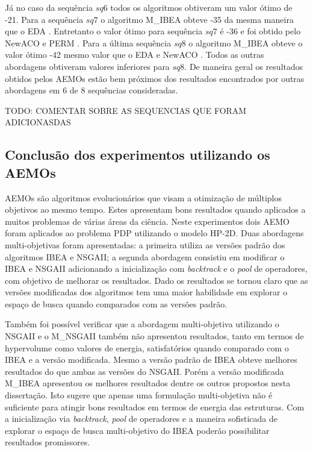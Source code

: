 Já no caso da sequência $sq6$ todos os algoritmos obtiveram um valor ótimo de -21. Para a sequência $sq7$ o algoritmo M\_IBEA obteve -35 da mesma maneira que o EDA \cite{santana2008protein}. Entretanto o valor ótimo para sequência $sq7$ é -36 e foi obtido pelo NewACO \cite{shmygelska2003improved} e PERM \cite{hsu2003growth}. Para a última sequência $sq8$ o algoritmo M\_IBEA obteve o valor ótimo -42 mesmo valor que o EDA \cite{EDA} e NewACO \cite{shmygelska2003improved}. Todos as outras abordagens obtiveram valores inferiores para $sq8$. De maneira geral os resultados obtidos pelos AEMOs estão bem próximos dos resultados encontrados por outras abordagens em 6 de 8 sequências consideradas.

TODO: COMENTAR SOBRE AS SEQUENCIAS QUE FORAM ADICIONASDAS 

\subsection{Conclusão dos experimentos utilizando os AEMOs}

AEMOs são algoritmos evolucionários que visam a otimização de múltiplos objetivos ao mesmo tempo. Estes apresentam bons resultados quando aplicados a muitos problemas de várias áreas da ciência.  Neste experimentos dois AEMO foram aplicados ao problema PDP utilizando o modelo HP-2D. Duas abordagens multi-objetivas foram apresentadas: a primeira utiliza as versões padrão dos algoritmos IBEA e NSGAII; a segunda abordagem consistiu em modificar o IBEA e NSGAII adicionando a inicialização com \textit{backtrack} e o \textit{pool} de operadores, com objetivo de melhorar os resultados. Dado os resultados se tornou claro que as versões modificadas dos algoritmos tem uma maior habilidade em explorar o espaço de busca quando comparados com as versões padrão.  

Também foi possível verificar que a abordagem multi-objetiva utilizando o NSGAII e o M\_NSGAII também não apresentou resultados, tanto em termos de hypervolume como valores de energia, satisfatórios quando comparado com o IBEA e a versão modificada. Mesmo a versão padrão de IBEA obteve melhores resultados do que ambas as versões do NSGAII. Porém a versão modificada M\_IBEA apresentou os melhores resultados dentre os outros propostos nesta dissertação. Isto sugere que apenas uma formulação multi-objetiva não é suficiente para atingir bons resultados em termos de energia das estruturas. Com a inicialização via \textit{backtrack}, \textit{pool} de operadores e a maneira sofisticada de explorar o espaço de busca multi-objetivo do IBEA poderão possibilitar resultados promissores.

